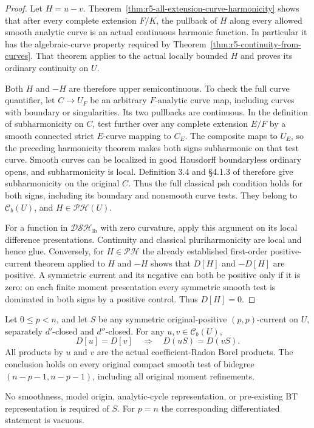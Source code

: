 \begin{proof}
Let $H=u-v$. Theorem~\ref{thm:r5-all-extension-curve-harmonicity}
shows that after every complete extension $F/K$, the pullback
of $H$ along every allowed smooth analytic curve is an actual
continuous harmonic function. In particular it has the
algebraic-curve property required by
Theorem~\ref{thm:r5-continuity-from-curves}. That theorem applies
to the actual locally bounded $H$ and proves its ordinary
continuity on $U$.

Both $H$ and $-H$ are therefore upper semicontinuous. To check
the full curve quantifier, let $C\to U_F$ be an arbitrary
$F$-analytic curve map, including curves with boundary or
singularities. Its two pullbacks are continuous. In the
definition of subharmonicity on $C$, test further over any
complete extension $E/F$ by a smooth connected strict
$E$-curve mapping to $C_E$. The composite maps to $U_E$,
so the preceding harmonicity theorem makes both signs
subharmonic on that test curve. Smooth curves can be
localized in good Hausdorff boundaryless ordinary opens,
and subharmonicity is local. Definition 3.4 and \S4.1.3
of \cite{GR25} therefore give subharmonicity on the original
$C$. Thus the full classical psh condition holds for both
signs, including its boundary and nonsmooth curve tests.
They belong to $\mathcal C_b(U)$, and
$H\in\mathscr{PH}(U)$.

For a function in $\mathscr{DSH}_{\mathrm{lb}}$ with zero
curvature, apply this argument on its local difference
presentations. Continuity and classical pluriharmonicity
are local and hence glue. Conversely, for
$H\in\mathscr{PH}$ the already established first-order
positive-current theorem applied to $H$ and $-H$ shows that
$D[H]$ and $-D[H]$ are positive. A symmetric current and its
negative can both be positive only if it is zero: on each
finite moment presentation every symmetric smooth test is
dominated in both signs by a positive control. Thus $D[H]=0$.
\end{proof}

\begin{theorem}
\label{thm:r5-arbitrary-background-potential-quotient}
Let $0\leq p<n$, and let $S$ be any symmetric original-positive
$(p,p)$-current on $U$, separately $d'$-closed and $d''$-closed.
For any $u,v\in\mathcal C_b(U)$,
\[
 D[u]=D[v]\quad\Longrightarrow\quad D(uS)=D(vS).
 \tag{Q}
\]
All products by $u$ and $v$ are the actual coefficient-Radon
Borel products. The conclusion holds on every original compact
smooth test of bidegree $(n-p-1,n-p-1)$, including all original
moment refinements.

No smoothness, model origin, analytic-cycle representation, or
pre-existing BT representation is required of $S$.
For $p=n$ the corresponding differentiated statement is vacuous.
\end{theorem}

